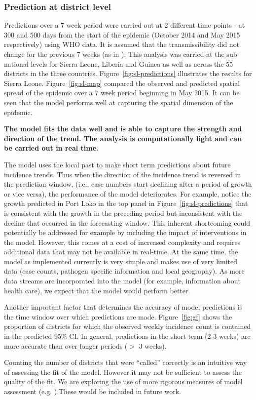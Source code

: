 \documentclass[11pt,]{article}
\begin{document}
\subsubsection{Prediction at district level}

Predictions over a 7 week period were carried out at 2 different time points - at 300 and
500 days from the start of the epidemic (October 2014 and May 2015
respectively) using WHO data. It is assumed that the 
transmissibility did not change for the previous 7 weeks (as in
\citep{team2015west}). This analysis was carried at the sub-national
levels for Sierra Leone, Liberia and
Guinea as well as across the 55 districts in the three countries.
Figure~\ref{fig:sl-predictions} illustrates the results for
Sierra Leone. Figure~\ref{fig:sl-map} compared the observed and
predicted spatial spread of the epidemic over a 7 week period
beginning in May 2015. It can be seen that the model performs well at
capturing the spatial dimension of the epidemic.

{\bfseries The model fits the data well and is able to capture the
  strength and direction of the trend. The analysis is computationally
  light and can be carried out in real time.

  The model uses the local past to make short term predictions about
  future incidence trends. Thus when the direction
  of the incidence trend is reversed in the prediction window, (i.e., case numbers start
  declining after a period of growth or vice
  versa), the performance of the model deteriorates. For example, notice the
  growth predicted in Port Loko in the top panel in
  Figure~\ref{fig:sl-predictions} that is consistent with the growth
  in the preceding period but inconsistent with the decline that
  occurred in the forecasting window. 
  This inherent shortcoming could potentially be addressed for example by including
  the impact of interventions in the model. However, this comes at a cost
  of increased complexity and requires additional data that may not be
  available in real-time. At the same time, the model as implemented
  currently is very simple and makes use of very limited data (case
  counts, pathogen specific information and local geography). As more
  data streams are incorporated into the model (for example,
  information about health care), we expect that the
  model would perform better.
  
  Another important factor that determines the accuracy of model
  predictions is the time window over which predictions are made.
  Figure~\ref{fig:gf} shows the proportion of districts for which the
  observed weekly incidence count is contained in the predicted 95\%
  CI. In general, predictions in the short term (2-3 weeks) are more
  accurate than over longer periods ($>$ 3 weeks).

  Counting the number of districts that were ``called'' correctly is
  an intuitive way of assessing the fit of the model. However it may
  not be sufficient to assess the quality of the fit. We are exploring
  the use of more rigorous measures of model assessment
  (e.g. \citep{funk2016real}).These would be included in future work.
  }
\end{document}
